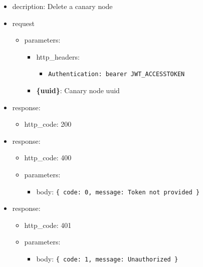 \documentclass[
]{article}
\begin{document}
\begin{itemize}
\item
  decription: Delete a canary node
\item
  request

  \begin{itemize}
  \item
    parameters:

    \begin{itemize}
    \item
      http\_headers:

      \begin{itemize}
      \item
        \texttt{Authentication:\ \textquotesingle{}bearer\ JWT\_ACCESSTOKEN\textquotesingle{}}
      \end{itemize}
    \item
      \textbf{\{uuid\}}: Canary node uuid
    \end{itemize}
  \end{itemize}
\item
  response:

  \begin{itemize}
  \item
    http\_code: 200
  \end{itemize}
\item
  response:

  \begin{itemize}
  \item
    http\_code: 400
  \item
    parameters:

    \begin{itemize}
    \item
      body: \texttt{\{
      \textquotesingle{}code\textquotesingle{}:\ 0,\ 
      \textquotesingle{}message\textquotesingle{}:\ \textquotesingle{}Token\ not\ provided\textquotesingle{}
      \}}
    \end{itemize}
  \end{itemize}
\item
  response:

  \begin{itemize}
  \item
    http\_code: 401
  \item
    parameters:

    \begin{itemize}
    \item
      body: \texttt{\{
      \textquotesingle{}code\textquotesingle{}:\ 1,\ 
      \textquotesingle{}message\textquotesingle{}:\ \textquotesingle{}Unauthorized\textquotesingle{}
      \}}
    \end{itemize}
  \end{itemize}
\end{itemize}
\end{document}
